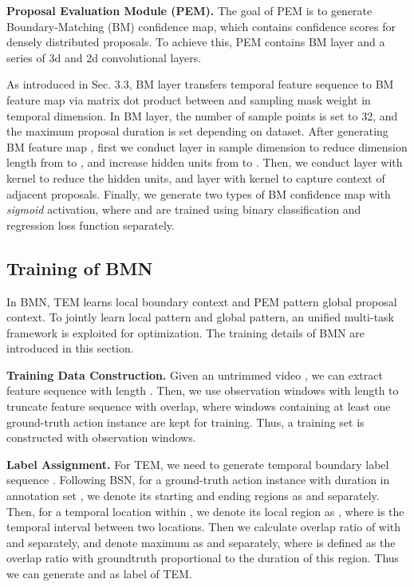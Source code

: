 \documentclass[10pt,twocolumn,letterpaper]{article}
\begin{document}
\noindent
\textbf{Proposal Evaluation Module (PEM).}
The goal of PEM is to generate Boundary-Matching (BM) confidence map, which contains  confidence scores for densely distributed proposals. To achieve this, PEM contains BM layer and a series of 3d and 2d convolutional layers.

As introduced in Sec. 3.3, BM layer transfers temporal feature sequence  to BM feature map  via matrix dot product between   and sampling mask weight  in temporal dimension.
In BM layer, the number of  sample points  is set to 32, and the maximum proposal duration  is set depending on dataset.
After generating BM feature map , first we conduct  layer in sample dimension to reduce dimension length from  to , and increase hidden units from  to . 
Then, we conduct  layer with  kernel to reduce the hidden units, and  layer with  kernel to capture context of adjacent proposals. Finally, we generate two types of BM confidence map  with \emph{sigmoid} activation, where  and  are trained using binary classification and regression loss function separately.



\subsection{Training of BMN}

In BMN, TEM learns local boundary context and PEM pattern global proposal  context.
To jointly learn local pattern and global pattern, an unified multi-task framework is exploited for optimization. The training details of BMN are introduced in this section.


\noindent
\textbf{Training Data Construction.}
Given an untrimmed video , we can extract feature sequence  with length .
Then, we use observation windows with length  to truncate feature sequence with  overlap, where windows containing at least one ground-truth action instance are kept for training.
Thus, a training set   is constructed with  observation windows.

\noindent
\textbf{Label Assignment.}
For TEM, we need to generate temporal boundary label sequence .
Following BSN\cite{lin2018bsn}, for a ground-truth action instance  with duration  in annotation set , we denote its starting and ending regions as  and  separately. 
Then, for a temporal location  within , we denote its local region as , where  is the temporal interval between two locations. 
Then we calculate overlap ratio  of  with  and  separately, and denote maximum  as  and  separately, where  is defined as the overlap
ratio with groundtruth proportional to the duration of this region.
Thus we can generate 
 and  as label of TEM.
\end{document}

